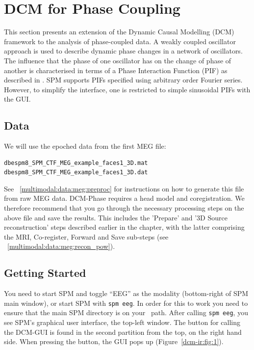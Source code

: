 \section{DCM for Phase Coupling \label{multimodal:data:dcm_phase}}

This section presents an extension of the Dynamic Causal Modelling (DCM) framework to the analysis of phase-coupled data. A weakly coupled oscillator approach is used to describe dynamic phase changes in a network of oscillators.
The influence that the phase of one oscillator has on the change of phase of another is characterised in terms of a Phase Interaction Function (PIF) as described in \cite{dcm_phase}. SPM supports PIFs specified using arbitrary order Fourier series. However, to simplify the interface, one is restricted to simple sinusoidal PIFs with the GUI. 

\subsection{Data}

We will use the epoched data from the first MEG file:

\begin{verbatim}
dbespm8_SPM_CTF_MEG_example_faces1_3D.mat
dbespm8_SPM_CTF_MEG_example_faces1_3D.dat
\end{verbatim}

See ~\ref{multimodal:data:meg:preproc} for instructions on how to generate this file from raw MEG data. DCM-Phase requires a head model and coregistration. We therefore recommend that you go through the necessary processing steps on the above file and save the results. This includes the 'Prepare' and '3D Source reconstruction' steps described earlier in the chapter, with the latter 
comprising the MRI, Co-register, Forward and Save sub-steps (see ~\ref{multimodal:data:meg:recon_pow}).

\subsection{Getting Started}

You need to start SPM and toggle ``EEG'' as the modality (bottom-right of SPM main window), or start SPM with \texttt{spm eeg}. In order for this to work you need to ensure that the main SPM directory is on your \matlab\ path.
After calling \texttt{spm eeg}, you see SPM's graphical user interface, the top-left window. The button for calling the DCM-GUI is found in the second partition from the top, on the right hand side. When pressing the button, the GUI pops up (Figure~\ref{dcm-ir:fig:1}).

